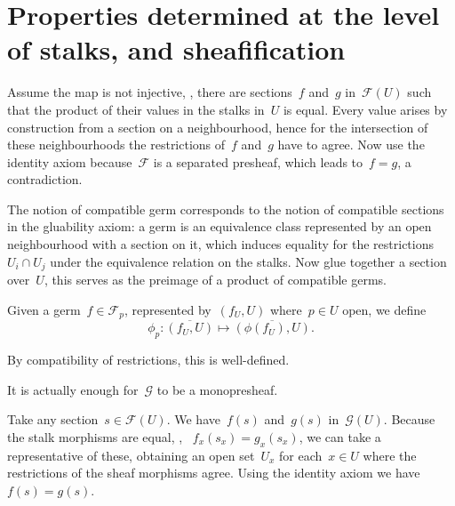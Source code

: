 \section{Properties determined at the level of stalks, and sheafification}

\begin{exercise}
  Assume the map is not injective, \ie, there are sections~$f$ and~$g$ in~$\mathcal{F}(U)$ such that the product of their values in the stalks in~$U$ is equal. Every value arises by construction from a section on a neighbourhood, hence for the intersection of these neighbourhoods the restrictions of~$f$ and~$g$ have to agree. Now use the identity axiom because~$\mathcal{F}$ is a separated presheaf, which leads to~$f=g$, a contradiction.
\end{exercise}

\begin{exercise}
  The notion of compatible germ corresponds to the notion of compatible sections in the gluability axiom: a germ is an equivalence class represented by an open neighbourhood with a section on it, which induces equality for the restrictions~$U_i\cap U_j$ under the equivalence relation on the stalks. Now glue together a section over~$U$, this serves as the preimage of a product of compatible germs.
\end{exercise}

\begin{exercise}
  Given a germ~$f\in\mathcal{F}_p$, represented by~$(f_U,U)$ where~$p\in U$ open, we define
  \begin{equation}
    \phi_p\colon \overline{(f_U,U)}\mapsto\overline{(\phi(f_U),U)}.
  \end{equation}

  By compatibility of restrictions, this is well-defined.
\end{exercise}

\begin{exercise}
  \label{exercise:34d}
  It is actually enough for~$\mathcal{G}$ to be a monopresheaf.

  Take any section~$s\in\mathcal{F}(U)$. We have~$f(s)$ and~$g(s)$ in~$\mathcal{G}(U)$. Because the stalk morphisms are equal, \ie, ~$f_x(s_x)=g_x(s_x)$, we can take a representative of these, obtaining an open set~$U_x$ for each~$x\in U$ where the restrictions of the sheaf morphisms agree. Using the identity axiom we have~$f(s)=g(s)$.
\end{exercise}

